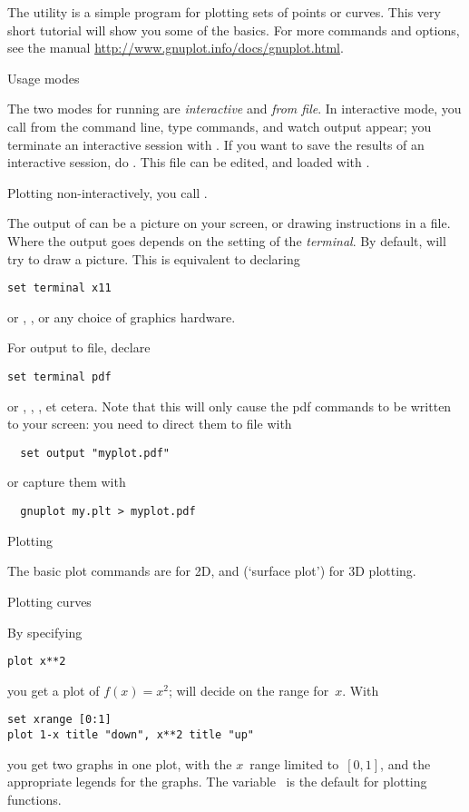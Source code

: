 The  utility is a
simple program for plotting sets of points or curves. This very short
tutorial will show you some of the basics. For more commands and
options, see the manual
\url{http://www.gnuplot.info/docs/gnuplot.html}.

 {Usage modes}

The two modes for running  are \emph{interactive} and
\emph{from file}. In interactive mode, you call  from the
command line, type commands, and watch output appear; you terminate an
interactive session with .  If you want to save the results of
an interactive session, do . This file can be
edited, and loaded with .

Plotting non-interactively, you call .

The output of  can be a picture on your screen, or drawing
instructions in a file. Where the output goes depends on the setting
of the \emph{terminal}. By default,  will try to draw a
picture. This is equivalent to declaring
\begin{verbatim}
set terminal x11
\end{verbatim}
or , , or any choice of graphics hardware.

For output to file, declare
\begin{verbatim}
set terminal pdf
\end{verbatim}
or , , , et cetera. Note that this will only
cause the pdf commands to be written to your screen: you need to
direct them to file with
\begin{verbatim}
  set output "myplot.pdf"
\end{verbatim}
or capture them with
\begin{verbatim}
  gnuplot my.plt > myplot.pdf
\end{verbatim}

 {Plotting}

The basic plot commands are  for 2D, and  (`surface
plot') for 3D plotting.

 {Plotting curves}

By specifying
\begin{verbatim}
plot x**2
\end{verbatim}
you get a plot of $f(x)=x^2$;  will decide on the range
for~$x$.
With
\begin{verbatim}
set xrange [0:1]
plot 1-x title "down", x**2 title "up"
\end{verbatim}
you get two graphs in one plot, with the $x$~range limited to~$[0,1]$,
and the appropriate legends for the graphs. The variable~ is the
default for plotting functions.


